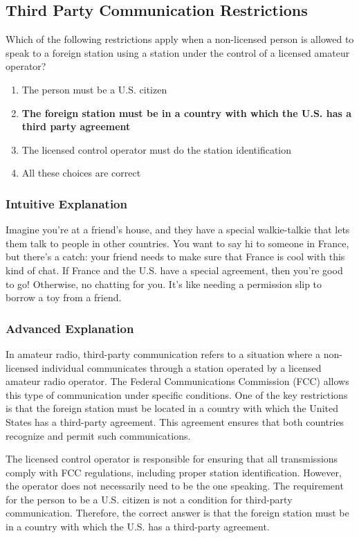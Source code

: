 \subsection{Third Party Communication Restrictions}
\label{T1F07}

\begin{tcolorbox}[colback=gray!10!white,colframe=black!75!black,title=T1F07]
Which of the following restrictions apply when a non-licensed person is allowed to speak to a foreign station using a station under the control of a licensed amateur operator?
\begin{enumerate}[label=\Alph*)]
    \item The person must be a U.S. citizen
    \item \textbf{The foreign station must be in a country with which the U.S. has a third party agreement}
    \item The licensed control operator must do the station identification
    \item All these choices are correct
\end{enumerate}
\end{tcolorbox}

\subsubsection{Intuitive Explanation}
Imagine you're at a friend's house, and they have a special walkie-talkie that lets them talk to people in other countries. You want to say hi to someone in France, but there's a catch: your friend needs to make sure that France is cool with this kind of chat. If France and the U.S. have a special agreement, then you're good to go! Otherwise, no chatting for you. It's like needing a permission slip to borrow a toy from a friend.

\subsubsection{Advanced Explanation}
In amateur radio, third-party communication refers to a situation where a non-licensed individual communicates through a station operated by a licensed amateur radio operator. The Federal Communications Commission (FCC) allows this type of communication under specific conditions. One of the key restrictions is that the foreign station must be located in a country with which the United States has a third-party agreement. This agreement ensures that both countries recognize and permit such communications.

The licensed control operator is responsible for ensuring that all transmissions comply with FCC regulations, including proper station identification. However, the operator does not necessarily need to be the one speaking. The requirement for the person to be a U.S. citizen is not a condition for third-party communication. Therefore, the correct answer is that the foreign station must be in a country with which the U.S. has a third-party agreement.


